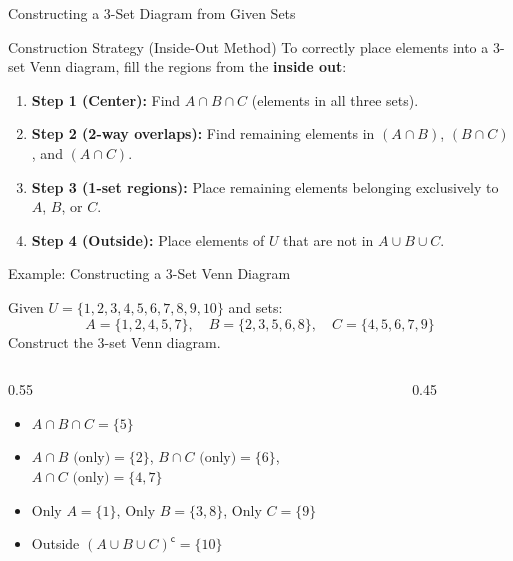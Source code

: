 \begin{frame}{Constructing a 3-Set Diagram from Given Sets}
\begin{block}{Construction Strategy (Inside-Out Method)}
To correctly place elements into a 3-set Venn diagram, fill the regions from the \textbf{inside out}:
\begin{enumerate}
\item \textbf{Step 1 (Center):} Find $A \cap B \cap C$ (elements in all three sets).
\item \textbf{Step 2 (2-way overlaps):} Find remaining elements in $(A \cap B)$, $(B \cap C)$, and $(A \cap C)$.
\item \textbf{Step 3 (1-set regions):} Place remaining elements belonging exclusively to $A$, $B$, or $C$.
\item \textbf{Step 4 (Outside):} Place elements of $U$ that are not in $A \cup B \cup C$.
\end{enumerate}
\end{block}
\end{frame}

\begin{frame}[t]{Example: Constructing a 3-Set Venn Diagram}
\begin{ex}
Given $U = \{1, 2, 3, 4, 5, 6, 7, 8, 9, 10\}$ and sets:
\[ A = \{1, 2, 4, 5, 7\}, \quad B = \{2, 3, 5, 6, 8\}, \quad C = \{4, 5, 6, 7, 9\} \]
Construct the 3-set Venn diagram.
\end{ex}
\begin{sol}
\begin{columns}
\begin{column}{0.55\textwidth}
\begin{itemize}\small
\item $A \cap B \cap C = \{5\}$
\item $A \cap B \text{ (only)} = \{2\}$, $B \cap C \text{ (only)} = \{6\}$, \\ $A \cap C \text{ (only)} = \{4, 7\}$
\item Only $A = \{1\}$, Only $B = \{3, 8\}$, Only $C = \{9\}$
\item Outside $(A \cup B \cup C)^\mathsf{c} = \{10\}$
\end{itemize}
\end{column}
\begin{column}{0.45\textwidth}
\centering
{}
\end{column}
\end{columns}
\end{sol}
\end{frame}


